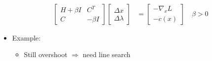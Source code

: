 \documentclass[11pt]{article}
\begin{document}
\begin{itemize}
    \begin{align*}
        \begin{bmatrix}
            H + \beta I & C^T \\
            C & -\beta I
        \end{bmatrix}
        \begin{bmatrix}
            \Delta x
            \\
            \Delta \lambda
        \end{bmatrix}
        &=
        \begin{bmatrix}
            -\nabla_x L \\
            -c(x)
        \end{bmatrix}
        \quad \beta >0
    \end{align*}
    \item Example:
    \begin{itemize}
        \item Still overshoot $\Rightarrow$ need line search
    \end{itemize}
\end{itemize}
\end{document}
